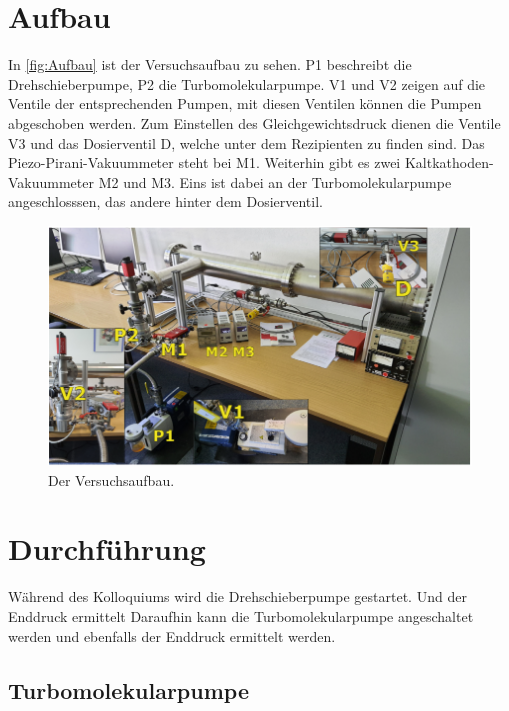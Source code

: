    \section{Aufbau}
        In \autoref{fig:Aufbau} ist der Versuchsaufbau zu sehen.
        P1 beschreibt die Drehschieberpumpe, P2 die Turbomolekularpumpe.
        V1 und V2 zeigen auf die Ventile der entsprechenden Pumpen, mit diesen Ventilen können die Pumpen abgeschoben werden.
        Zum Einstellen des Gleichgewichtsdruck dienen die Ventile V3 und das Dosierventil D, welche unter dem Rezipienten zu finden sind.
        Das Piezo-Pirani-Vakuummeter steht bei M1.
        Weiterhin gibt es zwei Kaltkathoden-Vakuummeter M2 und M3.
        Eins ist dabei an der Turbomolekularpumpe angeschlosssen, das andere hinter dem Dosierventil.

        \begin{figure}[H]
            \centering
            \includegraphics[width=\textwidth]{bilder/Aufbau.png}
            \caption{Der Versuchsaufbau.\cite{anleitung}}
            \label{fig:Aufbau}
        \end{figure}

    \section{Durchführung}
    \label{sec:Durchführung}
        Während des Kolloquiums wird die Drehschieberpumpe gestartet. Und der Enddruck ermittelt
        Daraufhin kann die Turbomolekularpumpe angeschaltet werden und ebenfalls der Enddruck ermittelt werden. 

        \subsection{Turbomolekularpumpe}
